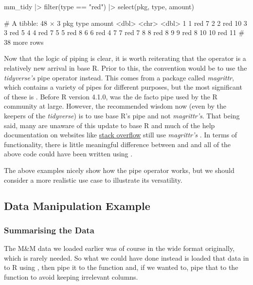 \begin{inR}
mm_tidy |> 
  filter(type == "red") |>
  select(pkg, type, amount)
\end{inR}
\begin{outR}
# A tibble: 48 × 3
     pkg type  amount
   <dbl> <chr>  <dbl>
 1     1 red        7
 2     2 red       10
 3     3 red        5
 4     4 red        7
 5     5 red        8
 6     6 red        4
 7     7 red        7
 8     8 red        8
 9     9 red        8
10    10 red       11
# 38 more rows
\end{outR}

Now that the logic of piping is clear, it is worth reiterating that the \R{|>} operator is a relatively new arrival in base R. Prior to this, the convention would be to use the \textit{tidyverse's} pipe operator \R{\%>\%} instead. This comes from a package called \textit{magrittr}, which contains a variety of pipes for different purposes, but the most significant of these is \R{\%>\%}. Before R version  4.1.0, \R{\%>\%} was the de facto pipe used by the R community at large. However, the recommended wisdom now (even by the keepers of the \textit{tidyverse}) is to use base R's pipe and not \textit{magrittr's}. That being said, many are unaware of this update to base R and much of the help documentation on websites like \href{https://stackoverflow.com/}{stack overflow} still use \textit{magrittr's} \R{\%>\%}. In terms of functionality, there is little meaningful difference between \R{|>} and \R{\%>\%} and all of the above code could have been written using \R{\%>\%}.

The above examples nicely show how the pipe operator works, but we should consider a more realistic use case to illustrate its versatility. 

\subsection{Data Manipulation Example}

\subsubsection{Summarising the Data}

The M\&M data we loaded earlier was of course in the wide format originally, which is rarely needed. So what we could have done instead is loaded that data in to R using , then pipe it to the  function and, if we wanted to, pipe that to the  function to avoid keeping irrelevant columns.

